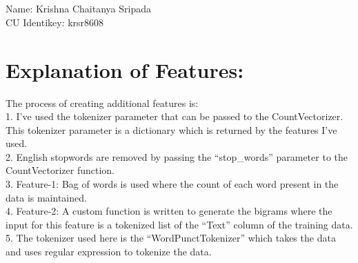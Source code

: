 \documentclass[10pt]{article}
\begin{document}
\section*{}
\begin{flushleft}
Name: Krishna Chaitanya Sripada\\
CU Identikey: krsr8608\\
\end{flushleft}
\section*{Explanation of Features: }
\begin{flushleft}
The process of creating additional features is:\\
\vspace{0.5em}
1. I've used the tokenizer parameter that can be passed to the CountVectorizer. This tokenizer parameter is a dictionary which is returned by the features I've used. \\
\vspace{0.5em}
2. English stopwords are removed by passing the ``stop\_words'' parameter to the CountVectorizer function.\\
\vspace{0.5em} 
3. Feature-1: Bag of words is used where the count of each word present in the data is maintained. \\
\vspace{0.5em}
4. Feature-2: A custom function is written to generate the bigrams where the input for this feature is a tokenized list of the ``Text'' column of the training data.\\
\vspace{0.5em}
5. The tokenizer used here is the ``WordPunctTokenizer'' which takes the data and uses regular expression to tokenize the data.\\
\end{flushleft}
\end{document}
